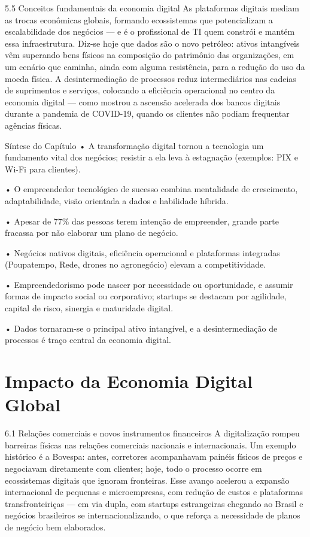5.5 Conceitos fundamentais da economia digital As plataformas digitais mediam as trocas econômicas globais, formando ecossistemas que potencializam a escalabilidade dos negócios — e é o profissional de TI quem constrói e mantém essa infraestrutura. Diz-se hoje que dados são o novo petróleo: ativos intangíveis vêm superando bens físicos na composição do patrimônio das organizações, em um cenário que caminha, ainda com alguma resistência, para a redução do uso da moeda física. A desintermediação de processos reduz intermediários nas cadeias de suprimentos e serviços, colocando a eficiência operacional no centro da economia digital — como mostrou a ascensão acelerada dos bancos digitais durante a pandemia de COVID-19, quando os clientes não podiam frequentar agências físicas.

Síntese do Capítulo • A transformação digital tornou a tecnologia um fundamento vital dos negócios; resistir a ela leva à estagnação (exemplos: PIX e Wi-Fi para clientes).

• O empreendedor tecnológico de sucesso combina mentalidade de crescimento, adaptabilidade, visão orientada a dados e habilidade híbrida.

• Apesar de 77\% das pessoas terem intenção de empreender, grande parte fracassa por não elaborar um plano de negócio.

• Negócios nativos digitais, eficiência operacional e plataformas integradas (Poupatempo, Rede, drones no agronegócio) elevam a competitividade.

• Empreendedorismo pode nascer por necessidade ou oportunidade, e assumir formas de impacto social ou corporativo; startups se destacam por agilidade, capital de risco, sinergia e maturidade digital.

• Dados tornaram-se o principal ativo intangível, e a desintermediação de processos é traço central da economia digital.

\chapter{Impacto da Economia Digital Global}

6.1 Relações comerciais e novos instrumentos financeiros A digitalização rompeu barreiras físicas nas relações comerciais nacionais e internacionais. Um exemplo histórico é a Bovespa: antes, corretores acompanhavam painéis físicos de preços e negociavam diretamente com clientes; hoje, todo o processo ocorre em ecossistemas digitais que ignoram fronteiras. Esse avanço acelerou a expansão internacional de pequenas e microempresas, com redução de custos e plataformas transfronteiriças — em via dupla, com startups estrangeiras chegando ao Brasil e negócios brasileiros se internacionalizando, o que reforça a necessidade de planos de negócio bem elaborados.

